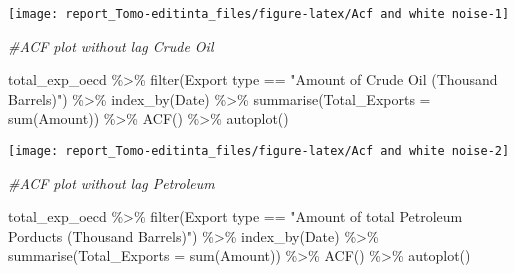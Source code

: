 \documentclass[
]{article}
\newenvironment{Shaded}{\begin{snugshade}}{\end{snugshade}}
\newcommand{\AttributeTok}[1]{\textcolor[rgb]{0.77,0.63,0.00}{#1}}
\newcommand{\CommentTok}[1]{\textcolor[rgb]{0.56,0.35,0.01}{\textit{#1}}}
\newcommand{\FunctionTok}[1]{\textcolor[rgb]{0.00,0.00,0.00}{#1}}
\newcommand{\NormalTok}[1]{#1}
\newcommand{\SpecialCharTok}[1]{\textcolor[rgb]{0.00,0.00,0.00}{#1}}
\newcommand{\StringTok}[1]{\textcolor[rgb]{0.31,0.60,0.02}{#1}}
\begin{document}
\begin{center}\texttt{[image: report\_Tomo-editinta\_files/figure-latex/Acf and white noise-1]} \end{center}

\begin{Shaded}
\begin{Highlighting}[]
\CommentTok{\#ACF plot without lag Crude Oil}

\NormalTok{total\_exp\_oecd }\SpecialCharTok{\%\textgreater{}\%} \FunctionTok{filter}\NormalTok{(}\StringTok{\textasciigrave{}}\AttributeTok{Export type}\StringTok{\textasciigrave{}} \SpecialCharTok{==} \StringTok{"Amount of Crude Oil (Thousand Barrels)"}\NormalTok{) }\SpecialCharTok{\%\textgreater{}\%} 
  \FunctionTok{index\_by}\NormalTok{(Date) }\SpecialCharTok{\%\textgreater{}\%} 
  \FunctionTok{summarise}\NormalTok{(}\AttributeTok{Total\_Exports =} \FunctionTok{sum}\NormalTok{(}\StringTok{\textasciigrave{}}\AttributeTok{Amount}\StringTok{\textasciigrave{}}\NormalTok{)) }\SpecialCharTok{\%\textgreater{}\%} 
  \FunctionTok{ACF}\NormalTok{() }\SpecialCharTok{\%\textgreater{}\%}  \FunctionTok{autoplot}\NormalTok{()}
\end{Highlighting}
\end{Shaded}

\begin{center}\texttt{[image: report\_Tomo-editinta\_files/figure-latex/Acf and white noise-2]} \end{center}

\begin{Shaded}
\begin{Highlighting}[]
\CommentTok{\#ACF plot without lag Petroleum}

\NormalTok{total\_exp\_oecd }\SpecialCharTok{\%\textgreater{}\%} \FunctionTok{filter}\NormalTok{(}\StringTok{\textasciigrave{}}\AttributeTok{Export type}\StringTok{\textasciigrave{}} \SpecialCharTok{==} \StringTok{"Amount of total Petroleum Porducts (Thousand Barrels)"}\NormalTok{) }\SpecialCharTok{\%\textgreater{}\%} 
  \FunctionTok{index\_by}\NormalTok{(Date) }\SpecialCharTok{\%\textgreater{}\%} 
  \FunctionTok{summarise}\NormalTok{(}\AttributeTok{Total\_Exports =} \FunctionTok{sum}\NormalTok{(}\StringTok{\textasciigrave{}}\AttributeTok{Amount}\StringTok{\textasciigrave{}}\NormalTok{)) }\SpecialCharTok{\%\textgreater{}\%} 
  \FunctionTok{ACF}\NormalTok{() }\SpecialCharTok{\%\textgreater{}\%}  \FunctionTok{autoplot}\NormalTok{()}
\end{Highlighting}
\end{Shaded}
\end{document}
